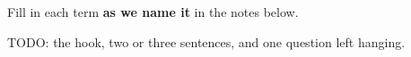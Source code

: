 \documentclass[12pt]{article}
\begin{document}

\vspace{2pt}

\boxguard[16]
\begin{vocabbox}
\small
Fill in each term \textbf{as we name it} in the notes below.
\par
{}
\par
{}
\par
{}
\par
\end{vocabbox}

\boxguard[14]
\begin{hookbox}
\small
TODO: the hook, two or three sentences, and one question left hanging.
\par{}
\end{hookbox}
\end{document}
